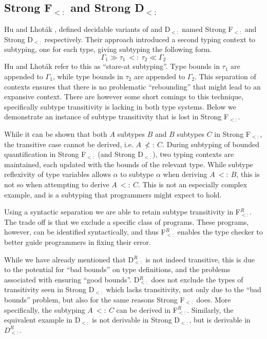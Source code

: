 \documentclass[runningheads, anon]{llncs}
\begin{document}
\subsection{Strong F$_{<:}$ and Strong D$_{<:}$}
Hu and Lhot\'{a}k \cite{10.1145/3371077}, defined decidable variants of \Fsub and D$_{<:}$ named Strong F$_{<:}$ and Strong D$_{<:}$ respectively.
Their approach introduced a second typing context to subtyping, one for each type, giving subtyping the following form. 
$$\Gamma_1 \gg \tau_1\ <:\ \tau_2 \ll \Gamma_2$$
Hu and Lhot\'{a}k refer to this as ``stare-at subtyping''. Type bounds in $\tau_1$ are appended to $\Gamma_1$, while type bounds in $\tau_2$ are appended to $\Gamma_2$. 
This separation of contexts ensures that there is no 
problematic ``rebounding'' \cite{Pierce:1992:BQU:143165.143228} that might lead to an expansive context. There are however some short comings to this technique, 
specifically subtype transitivity is lacking in both type systems. Below we demonstrate an instance of subtype transitivity  that is lost in 
Strong F$_{<:}$.
While it can be shown that both $A$ subtypes $B$ and $B$ subtypes $C$ in Strong F$_{<:}$, the transitive case cannot be derived, i.e.
$A\ \not<:\ C$. During subtyping of bounded quantification in Strong F$_{<:}$ (and Strong D$_{<:}$), two typing contexts are maintained, each updated with 
the bounds of the relevant type. While subtype reflexivity of type variables allows $\alpha$ to subtype $\alpha$ when deriving $A\ <:\ B$, 
this is not so when attempting to derive $A\ <:\ C$.
This is not an especially complex example, and is a subtyping that programmers might expect to hold.

Using a syntactic separation we are able to retain subtype transitivity in F$_{<:}^R$. The trade off is that we exclude a specific class of 
programs. These programs, however, can be identified syntactically, and thus F$_{<:}^R$ enables the type checker to better guide programmers in fixing their error.

While we have already mentioned that D$_{<:}^R$ is not indeed transitive, this is due to the potential for ``bad bounds'' on type definitions, and 
the problems associated with ensuring ``good bounds''. D$_{<:}^R$ does not exclude the types of transitivity seen in  Strong D$_{<:}$ which lacks transitivity, 
not only due to the ``bad bounds'' problem, but also for the same reasons Strong F$_{<:}$ does. More specifically, the subtyping $A\ <:\ C$ can be 
derived in F$_{<:}^R$. Similarly, the equivalent example in D$_{<:}$ is not derivable in Strong D$_{<:}$, but is derivable in $D_{<:}^R$.
\end{document}
